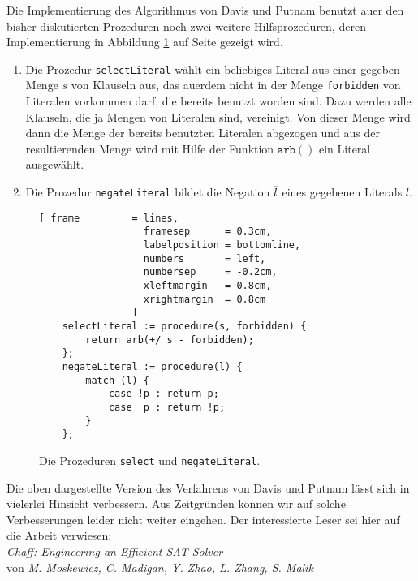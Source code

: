 Die Implementierung des Algorithmus von Davis und Putnam benutzt au\3er den bisher diskutierten Prozeduren
noch zwei weitere Hilfsprozeduren, deren Implementierung in 
Abbildung \ref{fig:solve-aux} auf Seite \pageref{fig:solve-aux} gezeigt wird.
\begin{enumerate}
\item Die Prozedur \texttt{selectLiteral} w\"{a}hlt ein beliebiges Literal aus 
      einer gegeben Menge $s$ von Klauseln aus, das au\3erdem nicht in der Menge
      \texttt{forbidden} von Literalen vorkommen darf, die bereits benutzt worden sind.
      Dazu werden alle Klauseln, die ja Mengen von Literalen sind, vereinigt.  Von dieser
      Menge wird dann die Menge der bereits benutzten Literalen abgezogen und aus der
      resultierenden Menge wird mit Hilfe der Funktion $\texttt{arb}()$ ein Literal ausgew\"{a}hlt.
\item Die Prozedur \texttt{negateLiteral} bildet die Negation $\overline{l}$ 
      eines gegebenen Literals $l$.  
\end{enumerate}
\begin{figure}[!ht]
  \centering
\begin{Verbatim}[ frame         = lines, 
                  framesep      = 0.3cm, 
                  labelposition = bottomline,
                  numbers       = left,
                  numbersep     = -0.2cm,
                  xleftmargin   = 0.8cm,
                  xrightmargin  = 0.8cm
                ]
    selectLiteral := procedure(s, forbidden) {
        return arb(+/ s - forbidden);
    };
    negateLiteral := procedure(l) {
        match (l) {
            case !p : return p;
            case  p : return !p;
        }
    };
\end{Verbatim}
\vspace*{-0.3cm}
  \caption{Die Prozeduren \texttt{select} und \texttt{negateLiteral}.}
  \label{fig:solve-aux}
\end{figure}

Die oben dargestellte Version des Verfahrens von Davis und Putnam l\"{a}sst sich in vielerlei
Hinsicht verbessern.  Aus Zeitgr\"{u}nden k\"{o}nnen wir auf solche Verbesserungen leider nicht
weiter eingehen. Der interessierte Leser sei hier auf die Arbeit \cite{moskewicz01}  verwiesen:
\\[0.2cm]
\hspace*{1.3cm} \textsl{Chaff: Engineering an Efficient SAT Solver} \\
\hspace*{1.3cm} von \emph{M. Moskewicz, C. Madigan, Y. Zhao, L. Zhang, S. Malik} 


